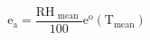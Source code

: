\documentclass[12pt]{article}
\begin{document}
\begin{displaymath}
\mathrm{e}_{\mathrm{a}}=\frac{\mathrm{RH}_{\text { mean }}}{100} \mathrm{e}^{\mathrm{o}}\left(\mathrm{T}_{\mathrm{mean}}\right)
\end{displaymath}
\end{document}
